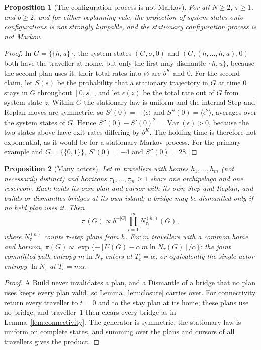 \documentclass[aps,pre,preprint,superscriptaddress,nofootinbib]{revtex4-2}
\newtheorem{proposition}{Proposition}
\theoremstyle{definition}
\theoremstyle{remark}
\newcommand{\N}{N_\tau}
\begin{document}
\begin{proposition}[The configuration process is not Markov]
\label{prop:nonmarkov}
For all $N\ge2$, $\tau\ge1$, and $b\ge2$, and for either replanning rule, the projection of system states onto configurations is not strongly lumpable, and the stationary configuration process is not Markov.
\end{proposition}
\begin{proof}
In $G=\{\{h,u\}\}$, the system states $(G,\sigma,0)$ and $(G,(h,\dots,h,u),0)$ both have the traveller at home, but only the first may dismantle $\{h,u\}$, because the second plan uses it; their total rates into $\varnothing$ are $b^K$ and $0$. For the second claim, let $S(s)$ be the probability that a stationary trajectory in $G$ at time $0$ stays in $G$ throughout $[0,s]$, and let $\epsilon(z)$ be the total rate out of $G$ from system state $z$. Within $G$ the stationary law is uniform and the internal Step and Replan moves are symmetric, so $S'(0)=-\langle\epsilon\rangle$ and $S''(0)=\langle\epsilon^2\rangle$, averages over the system states of $G$. Hence $S''(0)-S'(0)^2=\operatorname{Var}(\epsilon)>0$, because the two states above have exit rates differing by $b^K$. The holding time is therefore not exponential, as it would be for a stationary Markov process. For the primary example and $G=\{\{0,1\}\}$, $S'(0)=-4$ and $S''(0)=28$.
\end{proof}

\begin{proposition}[Many actors]
\label{prop:many}
Let $m$ travellers with homes $h_1,\dots,h_m$ (not necessarily distinct) and horizons $\tau_1,\dots,\tau_m\ge1$ share one archipelago and one reservoir. Each holds its own plan and cursor with its own Step and Replan, and builds or dismantles bridges at its own island; a bridge may be dismantled only if no held plan uses it. Then
\begin{equation}
  \pi(G)\propto b^{-|G|}\prod_{i=1}^m N^{(h_i)}_{\tau_i}(G),
\end{equation}
where $N^{(h)}_\tau$ counts $\tau$-step plans from $h$. For $m$ travellers with a common home and horizon, $\pi(G)\propto\exp\{-[U(G)-\alpha\,m\ln\N(G)]/\alpha\}$: the joint committed-path entropy $m\ln\N$ enters at $T_c=\alpha$, or equivalently the single-actor entropy $\ln\N$ at $T_c=m\alpha$.
\end{proposition}
\begin{proof}
A Build never invalidates a plan, and a Dismantle of a bridge that no plan uses keeps every plan valid, so Lemma~\ref{lem:closure} carries over. For connectivity, return every traveller to $t=0$ and to the stay plan at its home; these plans use no bridge, and traveller~1 then clears every bridge as in Lemma~\ref{lem:connectivity}. The generator is symmetric, the stationary law is uniform on complete states, and summing over the plans and cursors of all travellers gives the product.
\end{proof}
\end{document}
